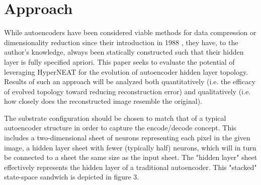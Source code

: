 \documentclass{acm_proc_article-sp}
\begin{document}
\section{Approach}
While autoencoders have been considered viable methods for data compression or dimensionality reduction since their introduction in 1988 \cite{bourland1988}, they have, to the author’s knowledge, always been statically constructed such that their hidden layer is fully specified apriori.  This paper seeks to evaluate the potential of leveraging HyperNEAT for the evolution of autoencoder hidden layer topology.  Results of such an approach will be analyzed both quantitatively (i.e. the efficacy of evolved topology toward reducing reconstruction error) and qualitatively (i.e. how closely does the reconstructed image resemble the original).

The substrate configuration should be chosen to match that of a typical autoencoder structure in order to capture the encode/decode concept.  This includes a two-dimensional sheet of neurons representing each pixel in the given image, a hidden layer sheet with fewer (typically half) neurons, which will in turn be connected to a sheet the same size as the input sheet.  The "hidden layer" sheet effectively represents the hidden layer of a traditional autoencoder.  This "stacked" state-space sandwich is depicted in figure 3.
\end{document}
